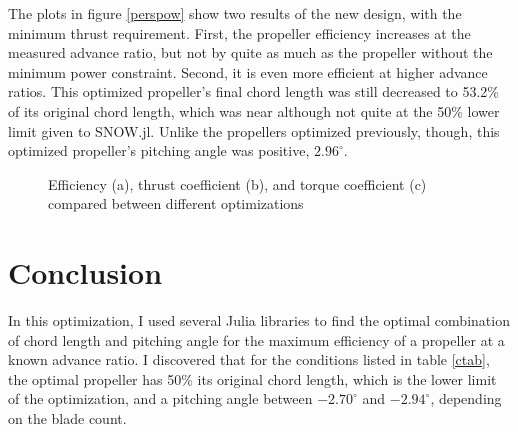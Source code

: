 \documentclass[journal ]{new-aiaa}
\newcounter{ctab}
\begin{document}
The plots in figure \eqref{perspow} show two results of the new design, with the minimum thrust requirement. First, the propeller efficiency increases at the measured advance ratio, but not by quite as much as the propeller without the minimum power constraint. Second, it is even more efficient at higher advance ratios. This optimized propeller's final chord length was still decreased to 53.2\% of its original chord length, which was near although not quite at the 50\% lower limit given to SNOW.jl. Unlike the propellers optimized previously, though, this optimized propeller's pitching angle was positive, $2.96^{\circ}$.

\begin{figure}[H]
\centering

	\hspace{1em}
	\caption{Efficiency (a), thrust coefficient (b), and torque coefficient (c) compared between different optimizations}
	\captionsetup{aboveskip=0pt,font=it}
	\label{perspow}
\end{figure}


\section{Conclusion}

In this optimization, I used several Julia libraries to find the optimal combination of chord length and pitching angle for the maximum efficiency of a propeller at a known advance ratio. I discovered that for the conditions listed in table \eqref{ctab}, the optimal propeller has 50\% its original chord length, which is the lower limit of the optimization, and a pitching angle between $-2.70^{\circ}$ and $-2.94^{\circ}$, depending on the blade count.
\end{document}
